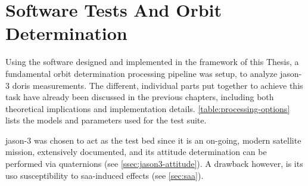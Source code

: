 \section{Software Tests And Orbit Determination}\label{sec:jason3-pod}

Using the software designed and implemented in the framework of this Thesis, a fundamental 
orbit determination processing pipeline was setup, to analyze \gls{jason}-3 
\gls{doris} measurements. The different, individual parts put together to achieve 
this task have already been discussed in the previous chapters, including both 
theoretical implications and implementation details. \autoref{table:processing-options} 
lists the models and parameters used for the test suite.

\gls{jason}-3 was chosen 
to act as the test bed since it is an on-going, modern satellite mission, extensively 
documented, and its attitude determination can be performed via quaternions 
(see \autoref{ssec:jason3-attitude}). A drawback however, is its \gls{uso} susceptibility 
to \gls{saa}-induced effects (see \autoref{sec:saa}).

